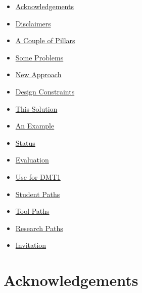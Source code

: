 \documentclass{book}
\providecommand{\tightlist}{%
  \setlength{\itemsep}{0pt}\setlength{\parskip}{0pt}}
\begin{document}
\begin{itemize}
  \begin{itemize}
  \tightlist
  \item
    \protect\hyperlink{pandoc.profile.debug__pandoc__debug__src__preface.md__acknowledgements}{Acknowledgements}
  \item
    \protect\hyperlink{pandoc.profile.debug__pandoc__debug__src__preface.md__disclaimers}{Disclaimers}
  \item
    \protect\hyperlink{pandoc.profile.debug__pandoc__debug__src__preface.md__a-couple-of-pillars}{A Couple of Pillars}
  \item
    \protect\hyperlink{pandoc.profile.debug__pandoc__debug__src__preface.md__some-problems}{Some Problems}
  \item
    \protect\hyperlink{pandoc.profile.debug__pandoc__debug__src__preface.md__new-approach}{New Approach}
  \item
    \protect\hyperlink{pandoc.profile.debug__pandoc__debug__src__preface.md__design-constraints}{Design Constraints}
  \item
    \protect\hyperlink{pandoc.profile.debug__pandoc__debug__src__preface.md__this-solution}{This Solution}
  \item
    \protect\hyperlink{pandoc.profile.debug__pandoc__debug__src__preface.md__an-example}{An Example}
  \item
    \protect\hyperlink{pandoc.profile.debug__pandoc__debug__src__preface.md__status}{Status}
  \item
    \protect\hyperlink{pandoc.profile.debug__pandoc__debug__src__preface.md__evaluation}{Evaluation}
  \item
    \protect\hyperlink{pandoc.profile.debug__pandoc__debug__src__preface.md__use-for-dmt1}{Use for DMT1}
  \item
    \protect\hyperlink{pandoc.profile.debug__pandoc__debug__src__preface.md__student-paths}{Student Paths}
  \item
    \protect\hyperlink{pandoc.profile.debug__pandoc__debug__src__preface.md__tool-paths}{Tool Paths}
  \item
    \protect\hyperlink{pandoc.profile.debug__pandoc__debug__src__preface.md__research-paths}{Research Paths}
  \item
    \protect\hyperlink{pandoc.profile.debug__pandoc__debug__src__preface.md__invitation}{Invitation}
  \end{itemize}
\end{itemize}

\hypertarget{pandoc.profile.debug__pandoc__debug__src__preface.md__acknowledgements}{%
\section*{Acknowledgements}\label{pandoc.profile.debug__pandoc__debug__src__preface.md__acknowledgements}}
\end{document}
